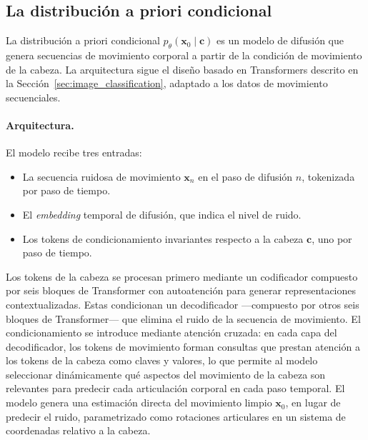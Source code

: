 \documentclass[../../book-main_es.tex]{subfiles}
\begin{document}
\subsection{La distribución a priori condicional}
\label{sub:egoallo_architecture}

La distribución a priori condicional $p_\theta(\boldsymbol{x}_0 \mid \boldsymbol{c})$ es un
modelo de difusión que genera secuencias de movimiento corporal a partir de la condición de movimiento de la cabeza.
La arquitectura sigue el diseño basado en Transformers
descrito en la Sección~\ref{sec:image_classification}, adaptado
a los datos de movimiento secuenciales.

\paragraph{Arquitectura.}
El modelo recibe tres entradas:
\begin{itemize}
    \item La secuencia ruidosa de movimiento $\boldsymbol{x}_n$ en el paso de difusión
        $n$, tokenizada por paso de tiempo.
    \item El \textit{embedding} temporal de difusión, que indica el nivel de ruido.
    \item Los tokens de condicionamiento invariantes respecto a la cabeza $\boldsymbol{c}$, uno por paso de tiempo.
\end{itemize}

Los tokens de la cabeza se procesan primero mediante un codificador compuesto por seis
bloques de Transformer con autoatención para generar representaciones
contextualizadas. Estas condicionan un decodificador ---compuesto por otros seis
bloques de Transformer--- que elimina el ruido de la secuencia de movimiento. El condicionamiento se introduce
mediante atención cruzada: en cada capa del decodificador, los tokens de movimiento forman
consultas que prestan atención a los tokens de la cabeza como claves y valores, lo que permite
al modelo seleccionar dinámicamente qué aspectos del movimiento de la cabeza son
relevantes para predecir cada articulación corporal en cada paso temporal. El modelo
genera una estimación directa del movimiento limpio $\boldsymbol{x}_0$, en lugar
de predecir el ruido, parametrizado como rotaciones articulares en un
sistema de coordenadas relativo a la cabeza.
\end{document}
